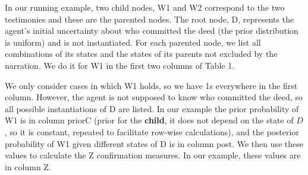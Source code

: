 \documentclass[10pt,]{scrartcl}
\newcommand{\s}[1]{\mbox{\textsf{#1}}}
\begin{document}
In our running example, two child nodes, \textsf{W1} and
\textsf{W2} correspond to the two testimonies and these are the parented  nodes.
 The root node, \textsf{D},
 represents the agent's initial uncertainty about who
committed the deed (the prior distribution is uniform) and is not
instantiated. 
For each parented node,  we list all combinations  of its states and the states of its parents not excluded by the narration. We do it for \textsf{W1} in the first two columns of Table 1.


\begin{table}
\begin{table}[H]
\centering
{}
\end{table}
\caption{ECS calculation table for \s{W1} in the first scenario in the \s{Witness} problem.}
\label{t:w1}
\end{table}


 We only consider cases in which \textsf{W1} holds, so we have 1s everywhere in the first column. However, the agent is not supposed to know who committed the deed, so all possible instantiations of \textsf{D} are listed.   In our example the prior probability of \s{W1} is in column \textsf{priorC} (prior for the \textbf{child}, it does not depend on the state of $D$, so it is constant, repeated to facilitate row-wise calculations), and the posterior probability of \textsf{W1} given different states of \textsf{D} is in column \s{post}.  We then  use these values to calculate the \s{Z} confirmation measures. In our example, these values are in column \s{Z}. 
 
\end{document}
